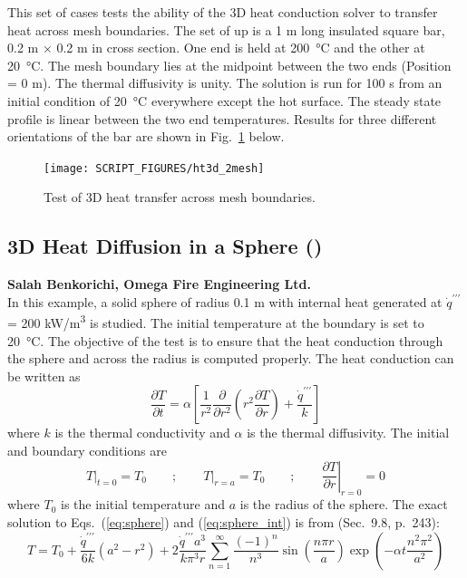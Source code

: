 \documentclass[11pt]{book}
\begin{document}
This set of cases tests the ability of the 3D heat conduction solver to transfer heat across mesh boundaries.  The set of up is a 1 m long insulated square bar, 0.2 m $\times$ 0.2 m in cross section.  One end is held at \SI{200}{\degreeCelsius} and the other at \SI{20}{\degreeCelsius}.  The mesh boundary lies at the midpoint between the two ends (Position = 0 m).  The thermal diffusivity is unity.  The solution is run for 100 s from an initial condition of \SI{20}{\degreeCelsius} everywhere except the hot surface.  The steady state profile is linear between the two end temperatures.  Results for three different orientations of the bar are shown in Fig.~\ref{fig:ht3d_2mesh} below.

\begin{figure}[ht]
\centering
\texttt{[image: SCRIPT\_FIGURES/ht3d\_2mesh]}
\caption[The  test cases]{Test of 3D heat transfer across mesh boundaries.}
\label{fig:ht3d_2mesh}
\end{figure}

\FloatBarrier

\subsection{3D Heat Diffusion in a Sphere (\texorpdfstring{}{ht3d\_sphere})}
\label{sec:ht3d_sphere}
\label{ht3d_sphere_102}
\label{ht3d_sphere_51}
\label{ht3d_sphere_25}

\textbf{Salah Benkorichi, Omega Fire Engineering Ltd.}\\

In this example, a solid sphere of radius 0.1 m with internal heat generated at $\dot{q}^{\prime\prime\prime}$ = 200 \si{kW/m^3} is studied. The initial temperature at the boundary is set to \SI{20}{\degreeCelsius}. The objective of the test is to ensure that the heat conduction through the sphere and across the radius is computed properly. The heat conduction can be written as
\begin{equation}
\label{eq:sphere}
\frac{\partial T}{\partial t} = \alpha \left[ \frac{1}{r^2} \frac{\partial}{\partial r^2} \left( r^2 \frac{\partial T}{\partial r} \right) + \frac{\dot{q}^{\prime\prime\prime}}{k} \right]
\end{equation}
where $k$ is the thermal conductivity and $\alpha$ is the thermal diffusivity.  The initial and boundary conditions are
\begin{equation}
\label{eq:sphere_int}
\left. T  \right|_{t=0} =T_0 \qquad; \qquad \left. T \right|_{r=a} = T_0 \qquad; \qquad \left. \frac{\partial T}{\partial r} \right|_{r=0}=0
\end{equation}
where $T_0$ is the initial temperature and $a$ is the radius of the sphere. The exact solution to Eqs.~(\ref{eq:sphere}) and (\ref{eq:sphere_int}) is from \cite{Carslaw:1} (Sec.~9.8, p.~243):
\begin{equation}
\label{eq:sphere_sol}
T = T_0 + \frac{\dot{q}^{\prime\prime\prime}}{6k} \left ( a^2 - r^2 \right ) + 2 \frac{\dot{q}^{\prime\prime\prime}a^3}{k\pi^3 r} \sum\limits_{n=1}^\infty \frac{(-1)^n}{n^3}\sin \left(\frac{n\pi r}{a}\right)\exp \left( -\alpha t \frac{n^2 \pi^2}{a^2} \right)
\end{equation}
\end{document}
